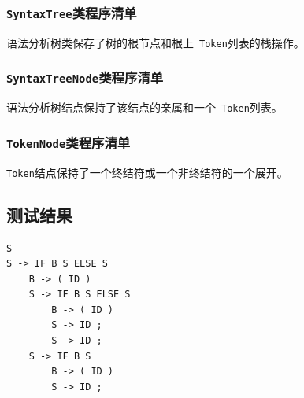 \subsubsection{\texttt{SyntaxTree}类程序清单}
语法分析树类保存了树的根节点和根上~\verb|Token|列表的栈操作。
{\linespread{1}
}
\subsubsection{\texttt{SyntaxTreeNode}类程序清单}
语法分析树结点保持了该结点的亲属和一个~\verb|Token|列表。
{\linespread{1}
}
\subsubsection{\texttt{TokenNode}类程序清单}
\verb|Token|结点保持了一个终结符或一个非终结符的一个展开。
{\linespread{1}
}
\subsection{测试结果}
{\linespread{1}
\begin{lstlisting}[caption=测试结果]
S
S -> IF B S ELSE S
    B -> ( ID )
    S -> IF B S ELSE S
        B -> ( ID )
        S -> ID ;
        S -> ID ;
    S -> IF B S
        B -> ( ID )
        S -> ID ;
\end{lstlisting}}